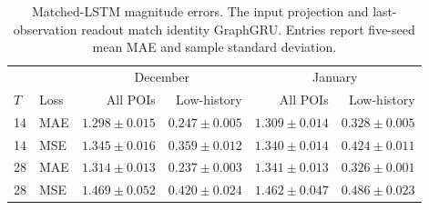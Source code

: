 \begin{table}[!htbp]
\centering\small
\caption{Matched-LSTM magnitude errors. The input projection and last-observation readout match identity GraphGRU. Entries report five-seed mean MAE and sample standard deviation.}
\label{tab:matched_lstm}
\begin{tabular}{llrrrr}
\toprule
 & & \multicolumn{2}{c}{December} & \multicolumn{2}{c}{January} \\
$T$ & Loss & All POIs & Low-history & All POIs & Low-history \\
\midrule
14 & MAE & $1.298\pm 0.015$ & $0.247\pm 0.005$ & $1.309\pm 0.014$ & $0.328\pm 0.005$ \\
14 & MSE & $1.345\pm 0.016$ & $0.359\pm 0.012$ & $1.340\pm 0.014$ & $0.424\pm 0.011$ \\
28 & MAE & $1.314\pm 0.013$ & $0.237\pm 0.003$ & $1.341\pm 0.013$ & $0.326\pm 0.001$ \\
28 & MSE & $1.469\pm 0.052$ & $0.420\pm 0.024$ & $1.462\pm 0.047$ & $0.486\pm 0.023$ \\
\bottomrule
\end{tabular}
\end{table}
